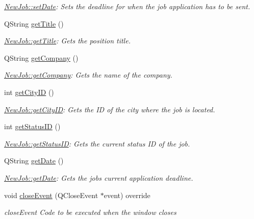 \begin{DoxyCompactItemize}
\begin{DoxyCompactList}\small\item\em \hyperlink{class_new_job_a0a1d9067e72f797ad3b1f01d44fedb0f}{New\+Job\+::set\+Date}\+: Sets the deadline for when the job application has to be sent. \end{DoxyCompactList}\item 
Q\+String \hyperlink{class_new_job_aa93c07712d80644b828994a01993c27c}{get\+Title} ()
\begin{DoxyCompactList}\small\item\em \hyperlink{class_new_job_aa93c07712d80644b828994a01993c27c}{New\+Job\+::get\+Title}\+: Gets the position title. \end{DoxyCompactList}\item 
Q\+String \hyperlink{class_new_job_ad4680ae9c009b90ce751c3c5fe60cdb5}{get\+Company} ()
\begin{DoxyCompactList}\small\item\em \hyperlink{class_new_job_ad4680ae9c009b90ce751c3c5fe60cdb5}{New\+Job\+::get\+Company}\+: Gets the name of the company. \end{DoxyCompactList}\item 
int \hyperlink{class_new_job_aed4a9a6fa7eab69062c1d36afd58cd75}{get\+City\+ID} ()
\begin{DoxyCompactList}\small\item\em \hyperlink{class_new_job_aed4a9a6fa7eab69062c1d36afd58cd75}{New\+Job\+::get\+City\+ID}\+: Gets the ID of the city where the job is located. \end{DoxyCompactList}\item 
int \hyperlink{class_new_job_aebbe015a22f5dbf60a34c33dd5c5a8e7}{get\+Status\+ID} ()
\begin{DoxyCompactList}\small\item\em \hyperlink{class_new_job_aebbe015a22f5dbf60a34c33dd5c5a8e7}{New\+Job\+::get\+Status\+ID}\+: Gets the current status ID of the job. \end{DoxyCompactList}\item 
Q\+String \hyperlink{class_new_job_abe92b6bce4e8e3485f59554a2cbad1bc}{get\+Date} ()
\begin{DoxyCompactList}\small\item\em \hyperlink{class_new_job_abe92b6bce4e8e3485f59554a2cbad1bc}{New\+Job\+::get\+Date}\+: Gets the job\textquotesingle{}s current application deadline. \end{DoxyCompactList}\item 
void \hyperlink{class_new_job_a84f6390f63ce01fb860b375f53f9c68d}{close\+Event} (Q\+Close\+Event $\ast$event) override
\begin{DoxyCompactList}\small\item\em close\+Event Code to be executed when the window closes \end{DoxyCompactList}\end{DoxyCompactItemize}


